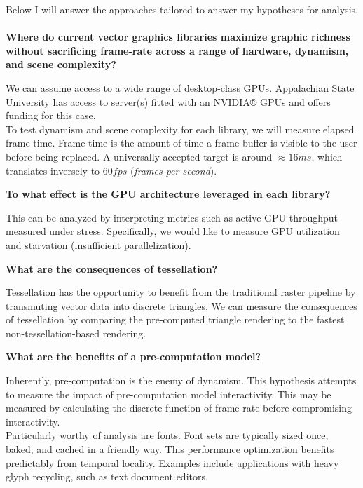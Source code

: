 Below I will answer the approaches tailored to answer my hypotheses for analysis.\\ 
\\
\textbf{Where do current vector graphics libraries maximize graphic richness without sacrificing frame-rate across a range of hardware, dynamism, and scene complexity?}\\
\begin{adjustwidth}{2cm}{}
We can assume access to a wide range of desktop-class GPUs. Appalachian State University has access to server(s) fitted with an NVIDIA® GPUs and offers funding for this case.\\

To test dynamism and scene complexity for each library, we will measure elapsed frame-time. Frame-time is the amount of time a frame buffer is visible to the user before being replaced. A universally accepted target is around $\approx16ms$, which translates inversely to $60fps$ (\textit{frames-per-second}).\\
\end{adjustwidth}

\textbf{To what effect is the GPU architecture leveraged in each library?}\\
\begin{adjustwidth}{2cm}{}
This can be analyzed by interpreting metrics such as active GPU throughput measured under stress. Specifically, we would like to measure GPU utilization and starvation (insufficient parallelization). \\
\end{adjustwidth}

\textbf{What are the consequences of tessellation?}\label{sec:lazy_tess}\\
\begin{adjustwidth}{2cm}{}
Tessellation has the opportunity to benefit from the traditional raster pipeline by transmuting vector data into discrete triangles. We can measure the consequences of tessellation by comparing the pre-computed triangle rendering to the fastest non-tessellation-based rendering.\\
\end{adjustwidth}

\textbf{What are the benefits of a pre-computation model?}\\
\begin{adjustwidth}{2cm}{}
Inherently, pre-computation is the enemy of dynamism. This hypothesis attempts to measure the impact of pre-computation model interactivity. This may be measured by calculating the discrete function of frame-rate before compromising interactivity.\\

Particularly worthy of analysis are fonts. Font sets are typically sized once, baked, and cached in a friendly way. This performance optimization benefits predictably from temporal locality. Examples include applications with heavy glyph recycling, such as text document editors.\\
\end{adjustwidth}

